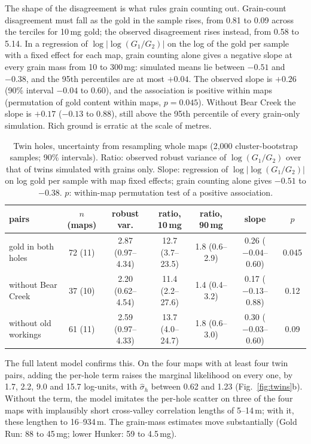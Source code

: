 \documentclass[11pt,a4paper]{article}
\theoremstyle{remark}
\begin{document}
The shape of the disagreement is what rules grain counting out. Grain-count disagreement must fall as the gold in the sample rises, from 0.81 to 0.09 across the terciles for 10\,mg gold; the observed disagreement rises instead, from 0.58 to 5.14. In a regression of $\log|\log(G_1/G_2)|$ on the log of the gold per sample with a fixed effect for each map, grain counting alone gives a negative slope at every grain mass from 10 to 300\,mg: simulated means lie between $-0.51$ and $-0.38$, and the 95th percentiles are at most $+0.04$. The observed slope is $+0.26$ (90\% interval $-0.04$ to 0.60), and the association is positive within maps (permutation of gold content within maps, $p = 0.045$). Without Bear Creek the slope is $+0.17$ ($-0.13$ to 0.88), still above the 95th percentile of every grain-only simulation. Rich ground is erratic at the scale of metres.

\begin{table}[t]
\centering
\footnotesize
\caption{Twin holes, uncertainty from resampling whole maps (2,000 cluster-bootstrap samples; 90\% intervals). Ratio: observed robust variance of $\log(G_1/G_2)$ over that of twins simulated with grains only. Slope: regression of $\log|\log(G_1/G_2)|$ on log gold per sample with map fixed effects; grain counting alone gives $-0.51$ to $-0.38$. $p$: within-map permutation test of a positive association.}
\label{tab:twinci}
\setlength{\tabcolsep}{3pt}
\begin{tabular}{lcccccc}
\toprule
pairs & $n$ (maps) & robust var. & ratio, 10\,mg & ratio, 90\,mg & slope & $p$ \\
\midrule
gold in both holes & 72 (11) & 2.87 (0.97--4.34) & 12.7 (3.7--23.5) & 1.8 (0.6--2.9) & 0.26 ($-0.04$--0.60) & 0.045 \\
without Bear Creek & 37 (10) & 2.20 (0.62--4.54) & 11.4 (2.2--27.6) & 1.4 (0.4--3.2) & 0.17 ($-0.13$--0.88) & 0.12 \\
without old workings & 61 (11) & 2.59 (0.97--4.33) & 13.7 (4.0--24.7) & 1.8 (0.6--3.0) & 0.30 ($-0.03$--0.60) & 0.09 \\
\bottomrule
\end{tabular}
\end{table}

The full latent model confirms this. On the four maps with at least four twin pairs, adding the per-hole term raises the marginal likelihood on every one, by 1.7, 2.2, 9.0 and 15.7 log-units, with $\hat\sigma_h$ between 0.62 and 1.23 (Fig.~\ref{fig:twins}b). Without the term, the model imitates the per-hole scatter on three of the four maps with implausibly short cross-valley correlation lengths of 5--14\,m; with it, these lengthen to 16--934\,m. The grain-mass estimates move substantially (Gold Run: 88 to 45\,mg; lower Hunker: 59 to 4.5\,mg).
\end{document}
